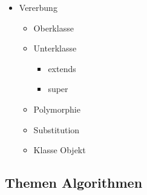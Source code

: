 \begin{itemize}
    \item Vererbung
    \begin{itemize}
        \item Oberklasse
        \item Unterklasse
        \begin{itemize}
            \item extends
            \item super
        \end{itemize}
        \item Polymorphie
        \item Substitution
        \item Klasse Objekt
    \end{itemize}
\end{itemize}

\subsection{Themen Algorithmen}
